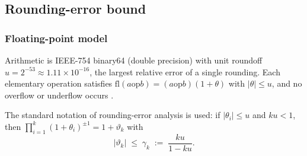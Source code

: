 \documentclass[11pt,a4paper]{article}
\theoremstyle{pstyle}
\theoremstyle{definition}
\theoremstyle{remark}
\newcommand{\abs}[1]{\lvert#1\rvert}
\newcommand{\mach}{u}
\begin{document}
\subsection{Rounding-error bound}
\label{sec:numerical-floor}

\subsubsection{Floating-point model}

\begin{assumption}
\label{ass:fp}
Arithmetic is IEEE-754 binary64 (double precision) \citep{ieee754} with
unit roundoff $\mach = 2^{-53} \approx 1.11\times10^{-16}$, the largest
relative error of a single rounding. Each elementary operation satisfies
$\mathrm{fl}(a \mathbin{\mathrm{op}} b) =
(a\mathbin{\mathrm{op}}b)(1+\theta)$ with $\abs{\theta}\le\mach$, and no
overflow or underflow occurs \citep{higham2002,goldberg1991}.
\end{assumption}

The standard notation of rounding-error analysis is used: if
$\abs{\theta_i}\le\mach$ and $k\mach<1$, then
$\prod_{i=1}^{k}(1+\theta_i)^{\pm1} = 1+\vartheta_k$ with
\begin{equation}
  \abs{\vartheta_k} \;\le\; \gamma_k \;:=\; \frac{k\mach}{1-k\mach}.
  \label{eq:gamma}
\end{equation}
\end{document}

